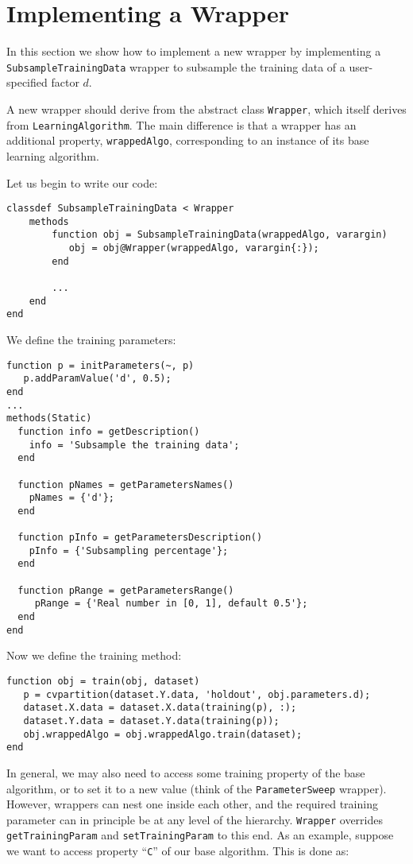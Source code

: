\section{Implementing a Wrapper}

In this section we show how to implement a new wrapper by implementing a \verb|SubsampleTrainingData| wrapper to subsample the training data of a  user-specified factor $d$.

A new wrapper should derive from the abstract class \verb|Wrapper|, which itself derives from \verb|LearningAlgorithm|. The main difference is that a wrapper has an additional property, \verb|wrappedAlgo|, corresponding to an instance of its base learning algorithm.

Let us begin to write our code:


\begin{lstlisting}
classdef SubsampleTrainingData < Wrapper
	methods
		function obj = SubsampleTrainingData(wrappedAlgo, varargin)
		   obj = obj@Wrapper(wrappedAlgo, varargin{:});
		end
		
		...
	end
end
\end{lstlisting}

\noindent We define the training parameters:

\begin{lstlisting}
function p = initParameters(~, p)
   p.addParamValue('d', 0.5);
end
...
methods(Static)
  function info = getDescription()
    info = 'Subsample the training data';
  end
        
  function pNames = getParametersNames()
    pNames = {'d'}; 
  end
        
  function pInfo = getParametersDescription()
    pInfo = {'Subsampling percentage'};
  end
        
  function pRange = getParametersRange()
     pRange = {'Real number in [0, 1], default 0.5'};
  end 
end
\end{lstlisting}

\noindent Now we define the training method:

\begin{lstlisting}
function obj = train(obj, dataset)
   p = cvpartition(dataset.Y.data, 'holdout', obj.parameters.d);
   dataset.X.data = dataset.X.data(training(p), :);
   dataset.Y.data = dataset.Y.data(training(p));
   obj.wrappedAlgo = obj.wrappedAlgo.train(dataset);
end
\end{lstlisting}

\noindent In general, we may also need to access some training property of the base algorithm, or to set it to a new value (think of the \verb|ParameterSweep| wrapper). However, wrappers can nest one inside each other, and the required training parameter can in principle be at any level of the hierarchy. \verb|Wrapper| overrides \verb|getTrainingParam| and \verb|setTrainingParam| to this end. As an example, suppose we want to access property ``\verb|C|'' of our base algorithm. This is done as:

